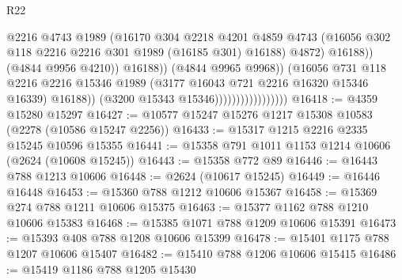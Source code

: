 \begin{lexlean}{R22}
\begin{coremodule}
                                                  @2216
                                                  @4743
                                                  @1989
                                                  (@16170
                                                    @304
                                                    @2218
                                                    @4201
                                                    @4859
                                                    @4743
                                                    (@16056
                                                      @302
                                                      @118
                                                      @2216
                                                      @2216
                                                      @301
                                                      @1989
                                                      (@16185 @301)
                                                      @16188)
                                                    @4872)
                                                  @16188))
                                              (@4844 @9956 @4210))
                                            @16188))
                                        (@4844 @9965 @9968))
                                      (@16056
                                        @731
                                        @118
                                        @2216
                                        @2216
                                        @15346
                                        @1989
                                        (@3177 @16043 @721 @2216 @16320 @15346 @16339)
                                        @16188))
                                    (@3200 @15343 @15346)))))))))))))))))
@16418 := @4359 @15280 @15297
@16427 := @10577 @15247 @15276 @1217 @15308 @10583 (@2278 (@10586 @15247 @2256))
@16433 := @15317 @1215 @2216 @2335 @15245 @10596 @15355
@16441 := @15358 @791 @1011 @1153 @1214 @10606 (@2624 (@10608 @15245))
@16443 := @15358 @772 @89
@16446 := @16443 @788 @1213 @10606
@16448 := @2624 (@10617 @15245)
@16449 := @16446 @16448
@16453 := @15360 @788 @1212 @10606 @15367
@16458 := @15369 @274 @788 @1211 @10606 @15375
@16463 := @15377 @1162 @788 @1210 @10606 @15383
@16468 := @15385 @1071 @788 @1209 @10606 @15391
@16473 := @15393 @408 @788 @1208 @10606 @15399
@16478 := @15401 @1175 @788 @1207 @10606 @15407
@16482 := @15410 @788 @1206 @10606 @15415
@16486 := @15419 @1186 @788 @1205 @15430

\end{coremodule}
\end{lexlean}
